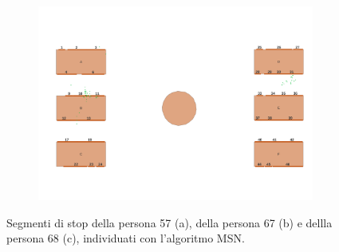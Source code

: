 \documentclass[12pt]{article}
\begin{document}
\begin{figure}[htb!]
\begin{subfigure}[b]{0.3\textwidth}
        \includegraphics[width=\textwidth]{images/stop_points_p68_MSN.png}
        \caption{}
        \label{stop_segments_p68_MSN}
    \end{subfigure}
    \hfill
    \caption{Segmenti di stop della persona 57 (a), della persona 67 (b) e dellla persona 68 (c), individuati con l'algoritmo MSN.}
    \label{stop_segments_MSN}
\end{figure}

\clearpage
\end{document}
